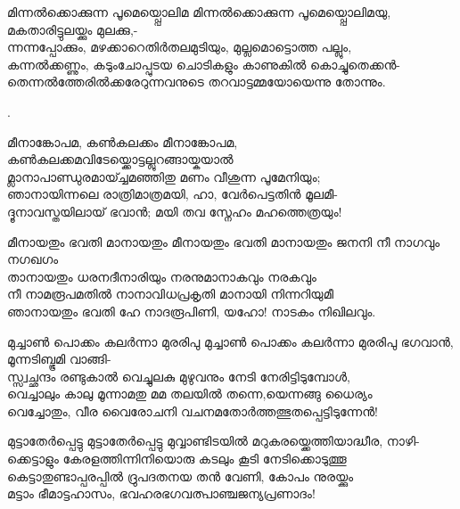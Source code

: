 \begin{enumerate}


\begin{slokam}{\VSr}{\OKM}{മിന്നൽക്കൊക്കുന്ന പൂമെയ്പ്പൊലിമ}
മിന്നൽക്കൊക്കുന്ന പൂമെയ്പ്പൊലിമയു, മകതാരിട്ടുലയ്ക്കും മുലക്കു,-\\
ന്നന്നപ്പോക്കും, മഴക്കാറെതിർതലമുടിയും, മുല്ലമൊട്ടൊത്ത പല്ലും,\\
കന്നൽക്കണ്ണും, കടുംചോപ്പുടയ ചൊടികളും കാണുകിൽ കൊച്ചുതെക്കൻ-\\
തെന്നൽത്തേരിൽക്കരേറുന്നവനുടെ തറവാട്ടമ്മയോയെന്നു തോന്നും.
\end{slokam}


.

\begin{slokam}{\VSv}{\VNM}{മീനാങ്കോപമ, കൺകലക്കം}
മീനാങ്കോപമ, കൺകലക്കമവിടേയ്ക്കൊട്ടല്ലുറങ്ങായ്കയാൽ\\
മ്ലാനാപാണ്ഡുരമായ്ച്ചമഞ്ഞിതു മണം വീശുന്ന പൂമേനിയും;\\
ഞാനായിന്നലെ രാത്രിമാത്രമയി, ഹാ, വേർപെട്ടതിൻ മൂലമീ-\\
ദ്ദൂനാവസ്തയിലായ്‌ ഭവാൻ; മയി തവ സ്നേഹം മഹത്തെത്രയും!
\end{slokam}


\begin{slokam}{\VMt}{\SNG}{മീനായതും ഭവതി മാനായതും}
 മീനായതും ഭവതി മാനായതും ജനനി നീ നാഗവും നഗഖഗം\\
താനായതും ധരനദീനാരിയും നരനുമാനാകവും നരകവും\\
നീ നാമരൂപമതിൽ നാനാവിധപ്രകൃതി മാനായി നിന്നറിയുമീ\\
ഞാനായതും ഭവതി ഹേ നാദരൂപിണി, യഹോ! നാടകം നിഖിലവും.
\end{slokam}


\begin{slokam}{\VSr}{\KKT}{മുച്ചാണ്‍ പൊക്കം കലര്‍ന്നാ മുരരിപു}
മുച്ചാണ്‍ പൊക്കം കലര്‍ന്നാ മുരരിപു ഭഗവാന്‍, മൂന്നടിബ്ഭൂമി വാങ്ങി-\\
സ്സ്വച്ഛന്ദം രണ്ടുകാല്‍ വെച്ചുലകു മുഴുവനും നേടി നേരിട്ടിടുമ്പോള്‍,\\
വെച്ചാലും കാലു മൂന്നാമതു മമ തലയില്‍ തന്നെ,യെന്നങ്ങു ധൈര്യം\\
വെച്ചോതും, വീര വൈരോചനി വചനമതോര്‍ത്തത്ഭുതപ്പെട്ടിടുന്നേന്‍! 
\end{slokam}


\begin{slokam}{\VSr}{\Vyl}{മുട്ടാതേർപ്പെട്ടു}
മുട്ടാതേർപ്പെട്ടു മുവ്വാണ്ടിടയിൽ മറുകരയ്ക്കെത്തിയാദ്ധീര, നാഴി-\\
ക്കെട്ടാളും കേരളത്തിന്നിനിയൊരു കടലും കൂടി നേടിക്കൊടുത്തൂ \\
കെട്ടാതുണ്ടാപ്പരപ്പിൽ ദ്രുപദതനയ തൻ വേണി, കോപം നുരയ്ക്കും\\
മട്ടാം ഭീമാട്ടഹാസം, ഭവഹരഭഗവത്പാഞ്ചജന്യപ്രണാദം!
\end{slokam}


\end{enumerate}
